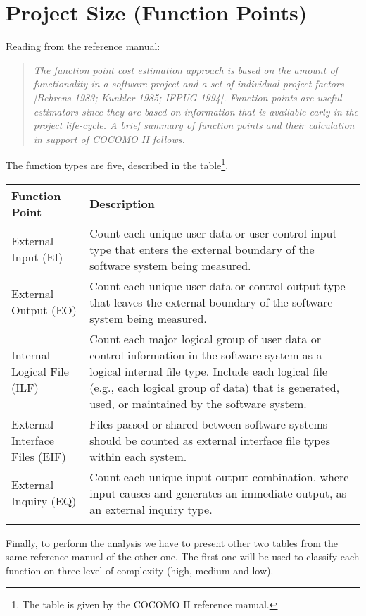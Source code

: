 \documentclass[\mainpath/main]{subfiles}
\begin{document}
\section{Project Size (Function Points)}
\label{ProjectEstimation:ProjectSize}
Reading from the reference manual:
\begin{quote}
	\textit{The function point cost estimation approach is based on the amount of functionality in a software project and a set of individual project factors [Behrens 1983; Kunkler 1985; IFPUG 1994]. Function points are useful estimators since they are based on information that is available early in the project life-cycle. A brief summary of function points and their calculation in support of COCOMO II follows.}
\end{quote}
The function types are five, described in the table\footnote{The table is given by the COCOMO II reference manual.}.\\[0.2cm]
\begin{tabular}[!ht]{l@{\hspace{1cm}}p{8.5cm}}
	\hline  \textbf{Function Point} & \textbf{Description}\\ 
	\hline External Input (EI) & Count each unique user data or user control input type that enters the external boundary of the software system being measured.\\ 
	\hline External Output (EO) & Count each unique user data or control output type that leaves the external boundary of the software system being measured.\\ 
	\hline Internal Logical File (ILF) & Count each major logical group of user data or control information in the software system as a logical internal file type. Include each logical file (e.g., each logical group of data) that is generated, used, or maintained by the software system.\\
	\hline External Interface Files (EIF) & Files passed or shared between software systems should be counted as external interface file types within each system.\\
	\hline External Inquiry (EQ) & Count each unique input-output combination, where input causes and generates an immediate output, as an external inquiry type.\\ \hline \\[1cm]
\end{tabular}

Finally, to perform the analysis we have to present other two tables from the same reference manual of the other one. The first one will be used to classify each function on three level of complexity (high, medium and low).
\end{document}
